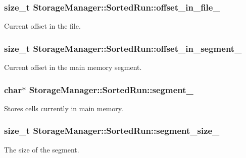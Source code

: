 \subsubsection[{offset\+\_\+in\+\_\+file\+\_\+}]{\setlength{\rightskip}{0pt plus 5cm}size\+\_\+t Storage\+Manager\+::\+Sorted\+Run\+::offset\+\_\+in\+\_\+file\+\_\+\hspace{0.3cm}{\ttfamily [private]}}\label{classStorageManager_1_1SortedRun_ac8fd9bf04636ddcac01d9e80ea03c22b}
Current offset in the file. \hypertarget{classStorageManager_1_1SortedRun_a062e90a0d3be1d66c9ef58dbeeef9948}{}
\subsubsection[{offset\+\_\+in\+\_\+segment\+\_\+}]{\setlength{\rightskip}{0pt plus 5cm}size\+\_\+t Storage\+Manager\+::\+Sorted\+Run\+::offset\+\_\+in\+\_\+segment\+\_\+\hspace{0.3cm}{\ttfamily [private]}}\label{classStorageManager_1_1SortedRun_a062e90a0d3be1d66c9ef58dbeeef9948}
Current offset in the main memory segment. \hypertarget{classStorageManager_1_1SortedRun_a9456dbaa3e38b142bb2f949dff875fa9}{}
\subsubsection[{segment\+\_\+}]{\setlength{\rightskip}{0pt plus 5cm}char$\ast$ Storage\+Manager\+::\+Sorted\+Run\+::segment\+\_\+\hspace{0.3cm}{\ttfamily [private]}}\label{classStorageManager_1_1SortedRun_a9456dbaa3e38b142bb2f949dff875fa9}
Stores cells currently in main memory. \hypertarget{classStorageManager_1_1SortedRun_a56ddf591148460a02ced2a7fd754bf5b}{}
\subsubsection[{segment\+\_\+size\+\_\+}]{\setlength{\rightskip}{0pt plus 5cm}size\+\_\+t Storage\+Manager\+::\+Sorted\+Run\+::segment\+\_\+size\+\_\+\hspace{0.3cm}{\ttfamily [private]}}\label{classStorageManager_1_1SortedRun_a56ddf591148460a02ced2a7fd754bf5b}
The size of the segment. \hypertarget{classStorageManager_1_1SortedRun_a908084f9f138cd5a6c07692b8cc576ea}{}
